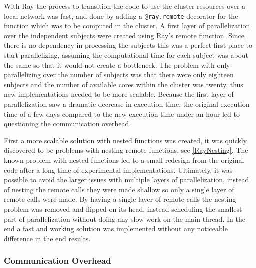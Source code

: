\documentclass[12pt, a4paper]{article}
\begin{document}
With Ray the process to transition the code to use the cluster resources over a local network was fast, and done by adding a \texttt{@ray.remote} decorator for the function which was to be computed in the cluster.
A first layer of parallelization over the independent subjects were created using Ray's remote function.
Since there is no dependency in processing the subjects this was a perfect first place to start parallelizing, assuming the computational time for each subject was about the same so that it would not create a bottleneck.
The problem with only parallelizing over the number of subjects was that there were only eighteen subjects and the number of available cores within the cluster was twenty, thus new implementations needed to be more scalable.
Because the first layer of parallelization saw a dramatic decrease in execution time, the original execution time of a few days compared to the new execution time under an hour led to questioning the communication overhead.

First a more scalable solution with nested functions was created, it was quickly discovered to be problems with nesting remote functions, see \cref{RayNesting}.
The known problem with nested functions led to a small redesign from the original code after a long time of experimental implementations. 
Ultimately, it was possible to avoid the larger issues with multiple layers of parallelization, instead of nesting the remote calls they were made shallow so only a single layer of remote calls were made.
By having a single layer of remote calls the nesting problem was removed and flipped on its head, instead scheduling the smallest part of parallelization without doing any slow work on the main thread.
In the end a fast and working solution was implemented without any noticeable difference in the end results.

\subsubsection{Communication Overhead}
\end{document}
